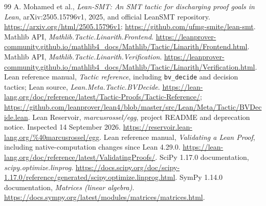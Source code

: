 \documentclass[11pt,letterpaper]{article}
\newcommand{\code}[1]{\texttt{#1}}
\theoremstyle{definition}\newtheorem{definition}[theorem]{Definition}
\theoremstyle{remark}\newtheorem{remark}[theorem]{Remark}
\begin{document}
\begin{thebibliography}{99}
 A. Mohamed et al., \emph{Lean-SMT: An SMT tactic for discharging proof goals in Lean}, arXiv:2505.15796v1, 2025, and official LeanSMT repository. \url{https://arxiv.org/html/2505.15796v1}; \url{https://github.com/ufmg-smite/lean-smt}.
 Mathlib API, \emph{Mathlib.Tactic.Linarith.Frontend}. \url{https://leanprover-community.github.io/mathlib4_docs/Mathlib/Tactic/Linarith/Frontend.html}.
 Mathlib API, \emph{Mathlib.Tactic.Linarith.Verification}. \url{https://leanprover-community.github.io/mathlib4_docs/Mathlib/Tactic/Linarith/Verification.html}.
 Lean reference manual, \emph{Tactic reference}, including \code{bv\_decide} and decision tactics; Lean source, \emph{Lean.Meta.Tactic.BVDecide}. \url{https://lean-lang.org/doc/reference/latest/Tactic-Proofs/Tactic-Reference/}; \url{https://github.com/leanprover/lean4/blob/master/src/Lean/Meta/Tactic/BVDecide.lean}.
 Lean Reservoir, \emph{marcusrossel/egg}, project README and deprecation notice. Inspected 14 September 2026. \url{https://reservoir.lean-lang.org/%40marcusrossel/egg}.
 Lean reference manual, \emph{Validating a Lean Proof}, including native-computation changes since Lean 4.29.0. \url{https://lean-lang.org/doc/reference/latest/ValidatingProofs/}.
 SciPy 1.17.0 documentation, \emph{scipy.optimize.linprog}. \url{https://docs.scipy.org/doc/scipy-1.17.0/reference/generated/scipy.optimize.linprog.html}.
 SymPy 1.14.0 documentation, \emph{Matrices (linear algebra)}. \url{https://docs.sympy.org/latest/modules/matrices/matrices.html}.
\end{thebibliography}
\end{document}
